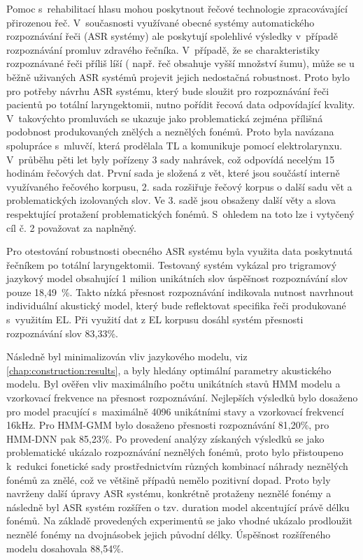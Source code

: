 Pomoc s~rehabilitací hlasu mohou poskytnout řečové technologie zpracovávající přirozenou řeč. V~současnosti využívané obecné systémy automatického rozpoznávání řeči (ASR systémy) ale poskytují spolehlivé výsledky v~případě rozpoznávání promluv zdravého řečníka. V~případě, že se charakteristiky rozpoznávané řeči příliš líší ( např. řeč obsahuje vyšší množství šumu), může se u běžně uživaných ASR systémů projevit jejich nedostačná robustnost. Proto bylo pro potřeby návrhu ASR systému, který bude sloužit pro rozpoznávání řeči pacientů po totální laryngektomii, nutno pořídit řecová data odpovídající kvality. V~takovýchto promluvách se ukazuje jako problematická zejména přílišná podobnost produkovaných znělých a neznělých fonémů. Proto byla navázana spolupráce s~mluvčí, která prodělala TL a komunikuje pomocí elektrolarynxu. V~průběhu pěti let byly pořízeny 3 sady nahrávek, což odpovídá necelým 15 hodinám řečových dat. První sada je složená z vět, které jsou součástí interně využívaného řečového korpusu, 2. sada rozšiřuje řečový korpus o další sadu vět a problematických izolovaných slov. Ve 3. sadě jsou obsaženy další věty a slova respektující protažení problematických fonémů.
S~ohledem na toto lze i vytyčený cíl č. 2 považovat za naplněný.

Pro otestování robustnosti obecného ASR systému byla využita data poskytnutá řečníkem po totální laryngektomii. Testovaný systém vykázal pro trigramový jazykový model obsahující 1 milion unikátních slov úspěšnost rozpoznávání slov pouze 18,49~\%. Takto nízká přesnost rozpoznávání indikovala nutnost navrhnout individuální akustický model, který bude reflektovat specifika řeči produkované s~využitím EL. Při využití dat z EL korpusu dosáhl systém přesnosti rozpoznávání slov 83,33\%.

Následně byl minimalizován vliv jazykového modelu, viz \ref{chap:construction:results}, a byly hledány optimální parametry akustického modelu. Byl ověřen vliv maximálního počtu unikátních stavů HMM modelu a vzorkovací frekvence na přesnost rozpoznávání. Nejlepších výsledků bylo dosaženo pro model pracující s~maximálně 4096 unikátními stavy a vzorkovací frekvencí 16kHz. Pro HMM-GMM bylo dosaženo přesnosti rozpoznávání 81,20\%, pro HMM-DNN pak 85,23\%. Po provedení analýzy získaných výsledků se jako problematické ukázalo rozpoznávání neznělých fonémů, proto bylo přistoupeno  k~redukci fonetické sady prostřednictvím různých kombinací náhrady neznělých fonémů za znělé, což ve většině případů nemělo pozitivní dopad. Proto byly navrženy další úpravy ASR systému, konkrétně protaženy neznělé fonémy a následně byl ASR systém rozšířen o tzv. duration model akcentující právě délku fonémů. Na základě provedených experimentů se jako vhodné ukázalo prodloužit neznělé fonémy na dvojnásobek jejich původní délky. Úspěšnost rozšířeného modelu dosahovala 88,54\%.

